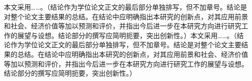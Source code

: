 

\begin{conclusion}

本文采用……。{\color{blue}（结论作为学位论文正文的最后部分单独排写，但不加章号。结论是对整个论文主要结果的总结。在结论中应明确指出本研究的创新点，对其应用前景和社会、经济价值等加以预测和评价，并指出今后进一步在本研究方向进行研究工作的展望与设想。结论部分的撰写应简明扼要，突出创新性。）本文采用……。（结论作为学位论文正文的最后部分单独排写，但不加章号。结论是对整个论文主要结果的总结。在结论中应明确指出本研究的创新点，对其应用前景和社会、经济价值等加以预测和评价，并指出今后进一步在本研究方向进行研究工作的展望与设想。结论部分的撰写应简明扼要，突出创新性。）}

\end{conclusion}